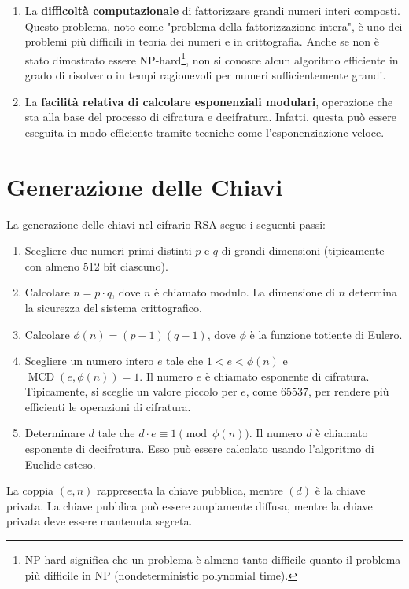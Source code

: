 \documentclass[a4paper,12pt]{report}
\begin{document}
\begin{enumerate}
    \item La \textbf{difficoltà computazionale} di fattorizzare grandi numeri interi composti. Questo problema, noto come "problema della fattorizzazione intera", è uno dei problemi più difficili in teoria dei numeri e in crittografia. Anche se non è stato dimostrato essere NP-hard\footnote[1]{NP-hard significa che un problema è almeno tanto difficile quanto il problema più difficile in NP (nondeterministic polynomial time).}, non si conosce alcun algoritmo efficiente in grado di risolverlo in tempi ragionevoli per numeri sufficientemente grandi.
    \item La \textbf{facilità relativa di calcolare esponenziali modulari}, operazione che sta alla base del processo di cifratura e decifratura. Infatti, questa può essere eseguita in modo efficiente tramite tecniche come l'esponenziazione veloce.
\end{enumerate}

\section{Generazione delle Chiavi}
La generazione delle chiavi nel cifrario RSA segue i seguenti passi:

\begin{enumerate}
    \item Scegliere due numeri primi distinti $p$ e $q$ di grandi dimensioni (tipicamente con almeno 512 bit ciascuno).
    \item Calcolare $n = p \cdot q$, dove $n$ è chiamato modulo. La dimensione di $n$ determina la sicurezza del sistema crittografico.
    \item Calcolare $\phi(n) = (p - 1)(q - 1)$, dove $\phi$ è la funzione totiente di Eulero.
    \item Scegliere un numero intero $e$ tale che $1 < e < \phi(n)$ e $\operatorname{MCD}(e, \phi(n)) = 1$. Il numero $e$ è chiamato esponente di cifratura. Tipicamente, si sceglie un valore piccolo per $e$, come $65537$, per rendere più efficienti le operazioni di cifratura.
    \item Determinare $d$ tale che $d \cdot e \equiv 1 \pmod{\phi(n)}$. Il numero $d$ è chiamato esponente di decifratura. Esso può essere calcolato usando l'algoritmo di Euclide esteso.
\end{enumerate}

La coppia $(e, n)$ rappresenta la chiave pubblica, mentre $(d)$ è la chiave privata. La chiave pubblica può essere ampiamente diffusa, mentre la chiave privata deve essere mantenuta segreta.
\end{document}

